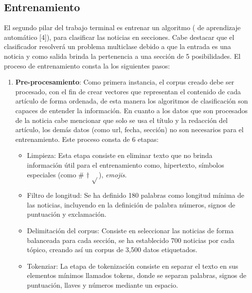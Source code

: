 \subsection{Entrenamiento}

El segundo pilar del trabajo terminal es entrenar un algoritmo ( de aprendizaje automático [4]), para clasificar las noticias en secciones. Cabe destacar que el clasificador resolverá un problema multiclase debido a que la entrada es una noticia y como salida brinda la pertenencia a una sección de 5 posibilidades. El proceso de entrenamiento consta la los siguientes pasos:\\

\begin{enumerate}
  \item \textbf{Pre-procesamiento}: Como primera instancia, el corpus creado debe ser procesado, con el fin de crear vectores que representan el contenido de cada artículo de forma ordenada, de esta manera los algoritmos de clasificación son capaces de entender la información. En cuanto a los datos que son procesados de la noticia cabe mencionar que solo se usa el título y la redacción del artículo, los demás datos (como url, fecha, sección) no son necesarios para el entrenamiento. Este proceso consta de 6 etapas: \\

  \begin{itemize}
    
    \item Limpieza: Esta etapa consiste en eliminar texto que no brinda información útil para el entrenamiento como, hipertexto, símbolos especiales (como \# $\dagger$ $\sqrt{ }$), \textit{emojis}.\\
    
    \item Filtro de longitud: Se ha definido 180 palabras como longitud mínima de las noticias, incluyendo en la definición de palabra números, signos de puntuación y exclamación.\\
    
    \item Delimitación del corpus: Consiste en seleccionar las noticias de forma balanceada para cada sección, se ha establecido 700 noticias por cada tópico, creando así un corpus de 3,500 datos etiquetados.\\
    
    \item Tokenziar: La etapa de tokenización consiste en separar el texto en sus elementos mínimos llamados tokens, donde se separan palabras, signos de puntuación, llaves y números mediante un espacio.\\
    

\end{itemize}
\end{enumerate}
